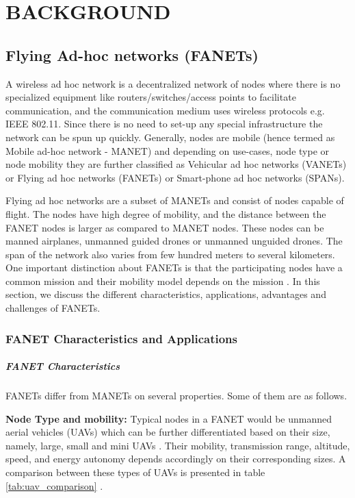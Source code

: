 \chapter{BACKGROUND}
\label{chap-two}

\section{Flying Ad-hoc networks (FANETs)}

A wireless ad hoc network is a decentralized network of nodes where there is no specialized equipment like routers/switches/access points to facilitate communication, and the communication medium uses wireless protocols e.g. IEEE 802.11. Since there is no need to set-up any special infrastructure the network can be spun up quickly. Generally, nodes are mobile (hence termed as Mobile ad-hoc network - MANET) and depending on use-cases, node type or node mobility they are further classified as Vehicular ad hoc networks (VANETs) or Flying ad hoc networks (FANETs) or Smart-phone ad hoc networks (SPANs).

Flying ad hoc networks are a subset of MANETs and consist of nodes capable of flight. The nodes have high degree of mobility, and the distance between the FANET nodes is larger as compared to MANET nodes. These nodes can be manned airplanes, unmanned guided drones or unmanned unguided drones. The span of the network also varies from few hundred meters to several kilometers. One important distinction about FANETs is that the participating nodes have a common mission and their mobility model depends on the mission \cite{OUBBATI201729}. In this section, we discuss the different characteristics, applications, advantages and challenges of FANETs.

\subsection{FANET Characteristics and Applications}
\paragraph{FANET Characteristics}
FANETs differ from MANETs on several properties. Some of them are as follows.

\textbf{Node Type and mobility:} Typical nodes in a FANET would be unmanned aerial vehicles (UAVs) which can be further differentiated based on their size, namely, large, small and mini UAVs \cite{OUBBATI201729}. Their mobility, transmission range, altitude, speed, and energy autonomy depends accordingly on their corresponding sizes. A comparison between these types of UAVs is presented in table \ref{tab:uav_comparison} \cite{OUBBATI201729}.

